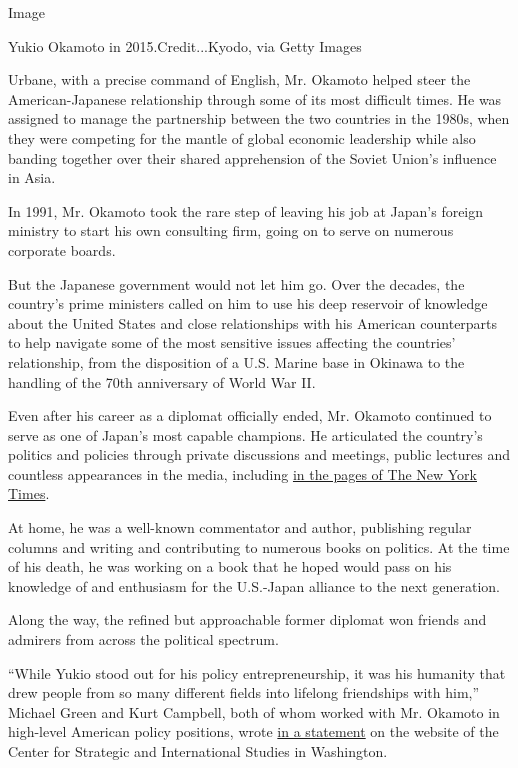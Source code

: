 Image

Yukio Okamoto in 2015.Credit...Kyodo, via Getty Images

Urbane, with a precise command of English, Mr. Okamoto helped steer the
American-Japanese relationship through some of its most difficult times.
He was assigned to manage the partnership between the two countries in
the 1980s, when they were competing for the mantle of global economic
leadership while also banding together over their shared apprehension of
the Soviet Union's influence in Asia.

In 1991, Mr. Okamoto took the rare step of leaving his job at Japan's
foreign ministry to start his own consulting firm, going on to serve on
numerous corporate boards.

But the Japanese government would not let him go. Over the decades, the
country's prime ministers called on him to use his deep reservoir of
knowledge about the United States and close relationships with his
American counterparts to help navigate some of the most sensitive issues
affecting the countries' relationship, from the disposition of a U.S.
Marine base in Okinawa to the handling of the 70th anniversary of World
War II.

Even after his career as a diplomat officially ended, Mr. Okamoto
continued to serve as one of Japan's most capable champions. He
articulated the country's politics and policies through private
discussions and meetings, public lectures and countless appearances in
the media, including
\href{https://www.nytimes3xbfgragh.onion/1991/03/17/weekinreview/the-world-the-view-from-inside-a-strained-relationship.html}{in
the pages of The New York Times}.

At home, he was a well-known commentator and author, publishing regular
columns and writing and contributing to numerous books on politics. At
the time of his death, he was working on a book that he hoped would pass
on his knowledge of and enthusiasm for the U.S.-Japan alliance to the
next generation.

Along the way, the refined but approachable former diplomat won friends
and admirers from across the political spectrum.

``While Yukio stood out for his policy entrepreneurship, it was his
humanity that drew people from so many different fields into lifelong
friendships with him,'' Michael Green and Kurt Campbell, both of whom
worked with Mr. Okamoto in high-level American policy positions, wrote
\href{https://www.csis.org/analysis/remembering-yukio-okamoto}{in a
statement} on the website of the Center for Strategic and International
Studies in Washington.


